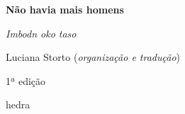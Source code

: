 




\begingroup\thispagestyle{empty}\vspace*{.05\textheight} 

              \formular
              \huge
              \noindent
              \textbf{Não havia mais homens}

              \bigskip  
              
              \large
              \noindent
              \textit{Imbodn oko taso}
              \vspace{12.5em}
              
              \newfontfamily{}
              {\selectfont\garamond\small\noindent Luciana Storto (\textit{organização e tradução})}

              \bigskip

              \noindent
              {\selectfont\garamond\small\noindent 1ª edição}

              \vfill

              \newfontfamily{}
              {\noindent\fontsize{30}{40}\selectfont \timesnewroman hedra}



\endgroup
\pagebreak
